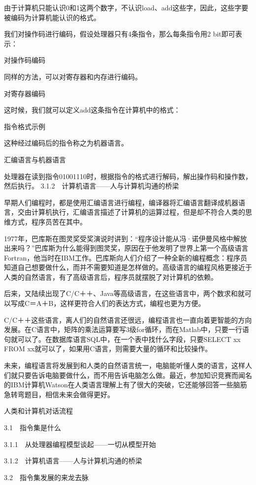 \documentclass[12pt,UTF8]{ctexbook}
\begin{document}
由于计算机只能认识0和1这两个数字，不认识load、add这些字，因此，这些字要被编码为计算机能认识的格式。

我们对操作码进行编码，假设处理器只有4条指令，那么每条指令用2 bit即可表示：

对操作码编码

同样的方法，可以对寄存器和内存进行编码。

对寄存器编码

这时候，我们就可以定义add这条指令在计算机中的格式：

指令格式示例

这种经过编码后的指令称之为机器语言。

汇编语言与机器语言

处理器在读到指令01001110时，根据指令的格式进行解码，解出操作码和操作数，然后执行。
3.1.2　计算机语言——人与计算机沟通的桥梁

早期人们编程时，都是使用汇编语言进行编程，编译器将汇编语言翻译成机器语言，交由计算机执行，汇编语言描述了计算机的运算过程，但是却不符合人类的思维方式，程序员苦在其中。

1977年，巴库斯在图灵奖受奖演说时讲到：“程序设计能从冯·诺伊曼风格中解放出来吗？”巴库斯为什么能得到图灵奖，原因在于他发明了世界上第一个高级语言Fortran，他当时在IBM工作。巴库斯向人们介绍了一种全新的编程概念：程序员知道自己想要做什么，而并不需要知道是怎样做的。高级语言的编程风格更接近于人类的自然语言，有了高级语言后，程序员就摆脱了对计算机的依赖。

后来，又陆续出现了C/C＋＋、Java等高级语言，在这些语言中，两个数求和就可以写成C＝A＋B，这样更符合人们的表达方式，编程也更为方便。

C/C＋＋这些语言，离人们的自然语言还很远，编程语言也一直向着更智能的方向发展。在C语言中，矩阵的乘法运算要写3级for循环，而在Matlab中，只要一行语句就可以了。在数据库语言SQL中，在一个表中找什么字段，只要SELECT xx FROM xx就可以了，如果用C语言，则需要大量的循环和比较操作。

未来，编程语言将发展到和人类的自然语言统一，电脑能听懂人类的语言，这样人们就只要告诉电脑要做什么，而不用告诉电脑怎么做。最近，参加知识竞赛而闻名的IBM计算机Watson在人类语言理解上有了很大的突破，它还能够回答一些脑筋急转弯题目，相信未来会做得更好。

人类和计算机对话流程


3.1　指令集是什么

3.1.1　从处理器编程模型谈起——一切从模型开始

3.1.2　计算机语言——人与计算机沟通的桥梁

3.2　指令集发展的来龙去脉
\end{document}
